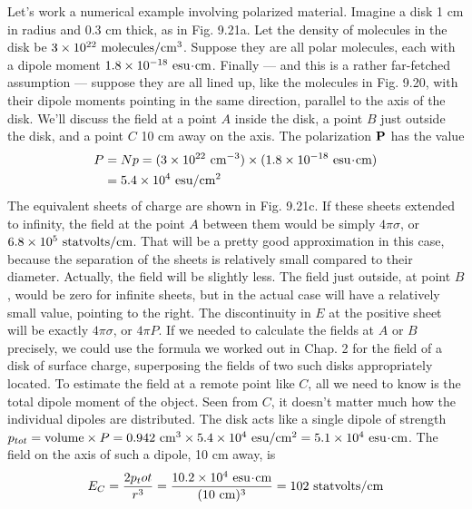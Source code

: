 Let's work a numerical example involving polarized material.
Imagine a disk 1 cm in radius and 0.3 cm thick, as in Fig. 9.21a. Let
the density of molecules in the disk be $3\times10^{22}\ \text{molecules}/\textup{cm}^3$.
Suppose they are all polar molecules, each with a dipole moment
$1.8 \times 10^{-18}\ \zu{esu}\unitdot\cmunit$. Finally --- and this is a rather far-fetched
assumption --- suppose they are all lined up, like the molecules in
Fig. 9.20, with their dipole moments pointing in the same direction,
parallel to the axis of the disk. We'll discuss the field at a point $A$
inside the disk, a point $B$ just outside the disk, and a point $C$ 10 cm
away on the axis. The polarization $\mathbf{P}$ has the value
\begin{align}
\begin{split}
  P &= Np = (3\times10^{22}\ \textup{cm}^{-3})\times(1.8 \times 10^{-18}\ \textup{esu}\!\cdot\!\textup{cm}) \\
    &= 5.4\times10^4\ \textup{esu}/\textup{cm}^2
\end{split}
\end{align}
The equivalent sheets of charge are shown in Fig. 9.21c. If these
sheets extended to infinity, the field at the point $A$ between them
would be simply $4\pi\sigma$, or $6.8 \times 10^5\ \zu{statvolts}/\cmunit$. That will be a
pretty good approximation in this case, because the separation of
the sheets is relatively small compared to their diameter. Actually,
the field will be slightly less. The field just outside, at point $B$, would
be zero for infinite sheets, but in the actual case will have a relatively
small value, pointing to the right. The discontinuity in $E$ at the
positive sheet will be exactly $4\pi\sigma$, or $4\pi P$. If we needed to calculate the
fields at $A$ or $B$ precisely, we could use the formula we worked out
in Chap. 2 for the field of a disk of surface charge, superposing the
fields of two such disks appropriately located. To estimate the field
at a remote point like $C$, all we need to know is the total dipole
moment of the object. Seen from $C$, it doesn't matter much how the
individual dipoles are distributed. The disk acts like a single dipole
of strength 
$p_{tot}=\text{volume}\times P=0.942\ \cmunit^3\times 5.4 \times 10^4\ \zu{esu}/\cmunit^2
=5.1\times10^4\ \zu{esu}\unitdot\cmunit$.
The field on the axis of such a dipole, 10 cm
away, is
\begin{equation}
  E_C = \frac{2p_tot}{r^3} = \frac{10.2\times10^4\ \zu{esu}\unitdot\cmunit}{(10\ \cmunit)^3}
       = 102\ \zu{statvolts}/\cmunit
\end{equation}

